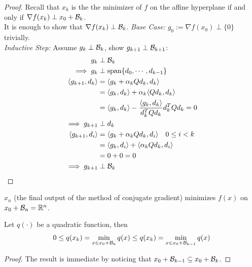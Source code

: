 \documentclass{article}
\begin{document}
	\begin{proof}
		Recall that $x_k$ is the the minimizer of $f$ on the affine hyperplane if and only if $\nabla f(x_k) \perp x_0 + \mathcal{{B}}_k$. \\
		It is enough to show that $\nabla f(x_k) \perp \mathcal{{B}}_k$.
		\emph{Base Case:} $g_0 := \nabla f(x_0) \perp \{0\}$ trivially. \\
		\emph{Inductive Step:} Assume $g_k \perp \mathcal{{B}}_k$, show $g_{k+1} \perp \mathcal{{B}}_{k+1}$:
		\begin{align}
			g_k &\perp \mathcal{{B}}_k \\
			\implies g_k &\perp \text{{span}}\{d_0, \cdots, d_{k-1}\} \\
			\langle {g_{k+1}}, {d_k} \rangle &= \langle {g_{k} + \alpha_k Q d_k}, {d_k} \rangle \\
			&= \langle {g_{k}}, {d_k} \rangle + \alpha_k \langle {Q d_k}, {d_k} \rangle \\
			&= \langle {g_{k}}, {d_k} \rangle - \frac{\langle {g_k}, {d_k} \rangle}{d^T_k Q d_k} d_k^T Q d_k
			= 0 \\
			\implies g_{k+1} &\perp d_k \\
			\langle {g_{k+1}}, {d_i} \rangle &= \langle {g_{k} + \alpha_k Q d_k}, {d_i} \rangle \quad 0 \leq i < k \\
			&= \langle {g_{k}}, {d_i} \rangle + \langle {\alpha_k Q d_k}, {d_i} \rangle \\
			&= 0 + 0 = 0 \\
			\implies g_{k+1} &\perp \mathcal{{B}}_k
		\end{align}
	\end{proof}
	
	\begin{corollary}
		$x_n$ (the final output of the method of conjugate gradient) minimizes $f(x)$ on $x_0 + \mathcal{{B}}_n = \mathbb{R}^n$.
	\end{corollary}
	
	\begin{corollary}
		Let $q(\cdot)$ be a quadratic function, then
		\begin{align}
			0 \leq q(x_k) = \min_{x \in x_0 + \mathcal{{B}}_k} q(x) \leq q(x_k) = \min_{x \in x_0 + \mathcal{{B}}_{k-1}} q(x)
		\end{align}
	\end{corollary}
	
	\begin{proof}
		The result is immediate by noticing that $x_0 + \mathcal{{B}}_{k-1} \subseteq x_0 + \mathcal{{B}}_k$.
	\end{proof}
	
\end{document}
